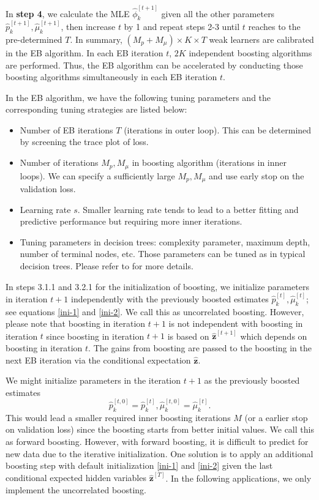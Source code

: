 \documentclass[11pt]{article}
\numberwithin{equation}{section}
\def\bx{\boldsymbol{x}}
\def\bz{\boldsymbol{z}}
\begin{document}
In {\bf step 4}, 
we calculate the MLE $\hat{\phi}_k^{[t+1]}$ given all the other parameters $\hat{p}_k^{[t+1]}, \hat{\mu}_k^{[t+1]}$, then increase $t$ by 1 and repeat steps 2-3 until $t$ reaches to the pre-determined $T$.
In summary, $(M_p+M_\mu)\times K\times T$ weak learners  are calibrated in the EB algorithm. In each EB iteration $t$, $2K$ independent boosting algorithms are performed. Thus, the EB algorithm can be accelerated by conducting those boosting algorithms simultaneously in each EB iteration $t$. 
		
In the EB algorithm, we have the following tuning parameters and the corresponding tuning strategies are listed below:
	\begin{itemize}
		\item Number of EB iterations {$T$} (iterations in outer loop). This can be determined by screening the trace plot of loss. 
		\item Number of iterations {$M_p,M_\mu$} in boosting algorithm  (iterations in inner loops). We can specify a sufficiently large $M_p,M_\mu$ and use  early stop on the validation loss.
		\item Learning rate {$s$}. Smaller learning rate tends to lead to a better fitting and predictive performance but requiring more inner iterations.
		\item Tuning parameters in decision trees: complexity parameter, maximum depth, number of terminal nodes, etc.
		Those parameters can be tuned as in typical decision trees. Please refer to \citet{hastie2009elements} for more details.
 	\end{itemize}

	In steps 3.1.1 and 3.2.1 for the initialization of boosting, 
	we initialize parameters in iteration $t+1$ {independently} with the previously boosted estimates $\hat{p}_k^{[t]}, \hat{\mu}_k^{[t]}$; see equations \eqref{ini-1} and \eqref{ini-2}. 
	We call this as uncorrelated boosting.
	However, please note that boosting in iteration $t+1$ is not independent with boosting in iteration $t$ since boosting in iteration $t+1$ is based on $\hat{\bz}^{[t+1]}$ which depends on boosting in iteration $t$. The gains from boosting are passed to  the boosting in the next EB iteration via the conditional expectation $\hat{\bz}$. 
	
	
	We might initialize parameters in the iteration $t+1$ as the previously boosted estimates $$\hat{p}_k^{[t,0]}=\hat{p}_k^{[t]}, \hat{\mu}_k^{[t,0]}=\hat{\mu}_k^{[t]}.$$
This would lead a {smaller} required inner boosting iterations $M$ (or a {earlier} stop on validation loss) since the boosting starts from better initial values.
	We call this as forward boosting. 
	However, with forward boosting, it is difficult to predict for new data due to the {iterative initialization}. One solution is to apply an additional boosting step with default initialization \eqref{ini-1} and \eqref{ini-2} given the {last conditional expected hidden variables $\hat{\bz}^{[T]}$}. In the following applications, we only implement the uncorrelated boosting.
			
\end{document}
